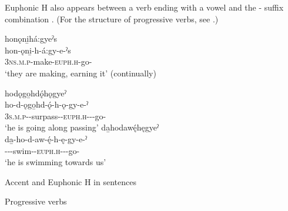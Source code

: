 Euphonic H also appears between a verb ending with a vowel and the  {\joinerA}-{\progressive} suffix combination . (For the structure of progressive verbs, see .)

\newpage
\ea\label{ex:euphhd}
\ea honǫni̱há:gyeˀs \\
\gll hon-ǫni̱-h-á:gy-e-ˀs\\
\textsc{3ns.m.p}-make-\textsc{euph.h}-go-{\habitual}\\
\glt ‘they are making, earning it’ (continually)


\ex hodǫgo̱hdǫ́hǫgyeˀ\\
\gll ho-d-ǫgo̱hd-ǫ́-h-ǫ-gy-e-ˀ\\
 \textsc{3s.m.p}-{\semireflexive}-surpass-{\stative}-\textsc{euph.h}-{\joiner}-{\progressive}-go-{\stative}\\
\glt `he is going along passing'
\ex da̱hodawę́hęgyeˀ\\
\gll da̱-ho-d-aw-ę́-h-ę-gy-e-ˀ\\
 {\cislocative}--{\semireflexive}-swim-{\stative}-\textsc{euph.h}-{\joiner}-{\progressive}-go-{\stative}\\
\glt `he is swimming towards us'
\z
\z


\begin{CayugaRelated}
\item Accent and Euphonic H in sentences 
\item Progressive verbs 
\end{CayugaRelated}
